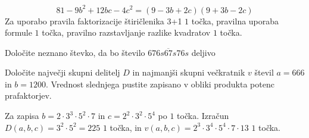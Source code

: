 \documentclass[addpoints]{exam}
\begin{document}
\begin{questions}
\begin{parts}
        \begin{solution}[3cm]
            $$81-9b^2+12bc-4c^2=(9-3b+2c)(9+3b-2c)$$
            Za uporabo pravila faktorizacije štiričlenika 3+1 $1$ točka, pravilna uporaba formule $1$ točka, pravilno razstavljanje razlike kvadratov $1$ točka.
        \end{solution}


    \end{parts}


    \newpage

    \question
    Določite neznano števko, da bo število $\overline{676s67s76s}$ deljivo




    \question[4]
    Določite največji skupni delitelj $D$ in najmanjši skupni večkratnik $v$ števil $a=666$ in $b=1200$.
    Vrednost slednjega pustite zapisano v obliki produkta potenc prafaktorjev.

    \begin{solution}[6cm]
        Za zapisa $b=2\cdot 3^3\cdot 5^2\cdot 7$ in $c=2^2\cdot 3^2\cdot 5^4$ po $1$ točka. 
        Izračun $D(a,b,c)=3^2\cdot 5^2=225$ $1$ točka, in $v(a,b,c)=2^3\cdot 3^4\cdot 5^4\cdot 7\cdot 13$ $1$ točka.
    \end{solution}
    

\end{questions}
\end{document}
